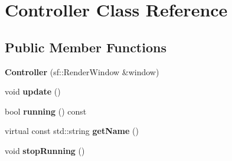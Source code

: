 \hypertarget{class_controller}{\section{Controller Class Reference}
\label{class_controller}
}
\subsection*{Public Member Functions}
\begin{DoxyCompactItemize}
\item 
\hypertarget{class_controller_a1dd7b13f9d247cfb325a60aaff59ed13}{{\bfseries Controller} (sf\-::\-Render\-Window \&window)}\label{class_controller_a1dd7b13f9d247cfb325a60aaff59ed13}

\item 
\hypertarget{class_controller_a7d04c17913f04f99429aa29fa8505484}{void {\bfseries update} ()}\label{class_controller_a7d04c17913f04f99429aa29fa8505484}

\item 
\hypertarget{class_controller_a59f4b9e698c7d0448fde49074b1a1cce}{bool {\bfseries running} () const }\label{class_controller_a59f4b9e698c7d0448fde49074b1a1cce}

\item 
\hypertarget{class_controller_a91c1ec826fcccc82654154ac934cc332}{virtual const std\-::string {\bfseries get\-Name} ()}\label{class_controller_a91c1ec826fcccc82654154ac934cc332}

\item 
\hypertarget{class_controller_afa31ab73a5339d64c41742e7ec45759c}{void {\bfseries stop\-Running} ()}\label{class_controller_afa31ab73a5339d64c41742e7ec45759c}

\end{DoxyCompactItemize}
